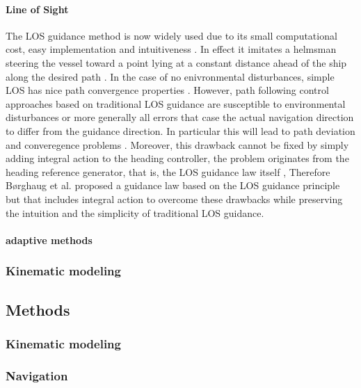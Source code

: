 \paragraph*{Line of Sight}
The LOS guidance method is now widely used due to its small computational cost, easy implementation and intuitiveness \cite{qi_curve_2022} \cite{caharija_integral_2016}. In effect it imitates a helmsman steering the vessel toward a point lying at a constant distance ahead of the ship along the desired path \cite{caharija_integral_2016}. In the case of no enivronmental disturbances, simple LOS has nice path convergence properties \cite{borhaug_integral_2008}. However, path following control approaches based on traditional LOS guidance are susceptible to environmental disturbances \cite{borhaug_integral_2008} or more generally all errors that case the actual navigation direction to differ from the guidance direction. In particular this will lead to path deviation and converegence problems \cite{borhaug_integral_2008}. Moreover, this drawback cannot be fixed by simply adding integral action to the heading controller, the problem originates from the heading reference generator, that is, the LOS guidance law itself \cite{borhaug_integral_2008}, Therefore Børghaug et al. \cite{borhaug_integral_2008} proposed a guidance law based on the LOS guidance principle but that includes integral action to overcome these drawbacks while preserving the intuition and the simplicity of traditional LOS guidance.

\paragraph*{adaptive methods}

\subsubsection{Kinematic modeling}



\subsection{Methods}

\subsubsection{Kinematic modeling}

\subsubsection{Navigation}

